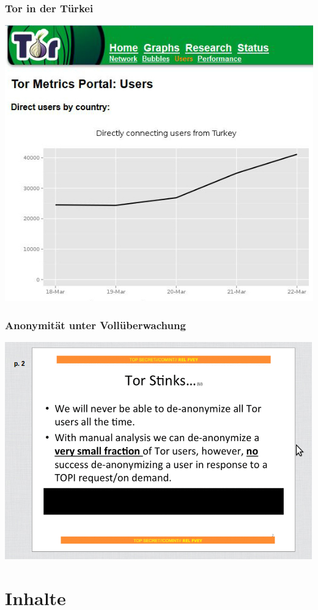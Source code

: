 \documentclass[12pt]{beamer}
\begin{document}
\begin{frame}
    \frametitle{Tor in der Türkei}
    \includegraphics[height=0.7\textheight]{img/tor-tuerkei.jpg}
\end{frame}

\begin{frame}
    \frametitle{Anonymität unter Vollüberwachung}
    \includegraphics[height=0.7\textheight]{img/torstinks.png}
\end{frame}

\section{Inhalte}
\end{document}
